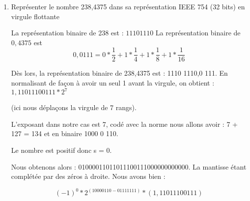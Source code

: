 \documentclass[a4paper,11pt]{article}
\begin{document}
\begin{enumerate}
\item{Représenter le nombre 238,4375 dans sa représentation IEEE 754 (32 bits) en virgule flottante}

La représentation binaire de 238 est : $1110 1110$
La représentation binaire de $0,4375$ est $$0,0111 = 0*\frac{1}{2} + 1*\frac{1}{4} + 1*\frac{1}{8}+ 1*\frac{1}{16}$$

Dès lors, la représentation binaire de 238,4375 est : 1110 1110,0 111.
En normalisant de façon à avoir un seul 1 avant la virgule, on obtient :
$1, 110 1110 0111 * 2^7$

(ici nous déplaçons la virgule de 7 rangs).

L'exposant dans notre cas est 7, codé avec la norme nous allons avoir :
7 + 127 = 134 et en binaire 1000 0 110.

Le nombre est positif donc s = 0.

Nous obtenons alors : 01000011011011100111000000000000.
La mantisse étant complétée par des zéros à droite. Nous avons bien :


$$ (-1)^0*2^{(10000110 - 0111 1111)} * (1,110 1110 0111)$$
\end{enumerate}
\end{document}
